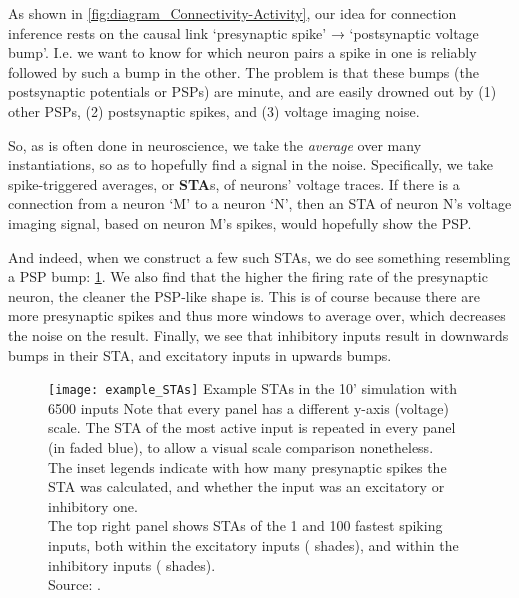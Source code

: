 
As shown in \cref{fig:diagram_Connectivity-Activity}, our idea for connection inference rests on the causal link `presynaptic spike' → `postsynaptic voltage bump'. I.e. we want to know for which neuron pairs a spike in one is reliably followed by such a bump in the other. The problem is that these bumps (the postsynaptic potentials or PSPs) are minute, and are easily drowned out by (1) other PSPs, (2) postsynaptic spikes, and (3) voltage imaging noise.

So, as is often done in neuroscience, we take the \emph{average} over many instantiations, so as to hopefully find a signal in the noise. Specifically, we take spike-triggered averages, or \textbf{STA}s, of neurons' voltage traces. If there is a connection from a neuron `M' to a neuron `N', then an STA of neuron N's voltage imaging signal, based on neuron M's spikes, would hopefully show the PSP.

And indeed, when we construct a few such STAs, we do see something resembling a PSP bump: \cref{fig:example_STAs}. We also find that the higher the firing rate of the presynaptic neuron, the cleaner the PSP-like shape is. This is of course because there are more presynaptic spikes and thus more windows to average over, which decreases the noise on the result. Finally, we see that inhibitory inputs result in downwards bumps in their STA, and excitatory inputs in upwards bumps.

\begin{figure}
    \hspace*{-3em}
    \texttt{[image: example\_STAs]}
    \vspace*{1em}
    \captionn
        {Example STAs in the 10' simulation with 6500 inputs}
        {
        Note that every panel has a different y-axis (voltage) scale. The STA of the most active input is repeated in every panel (in faded blue), to allow a visual scale comparison nonetheless.\\
        The inset legends indicate with how many presynaptic spikes the STA was calculated, and whether the input was an excitatory or inhibitory one.\\
        The top right panel shows STAs of the 1 and 100 fastest spiking inputs, both within the excitatory inputs ( shades), and within the inhibitory inputs ( shades).\\
        Source: .
        }
    \label{fig:example_STAs}
\end{figure}

